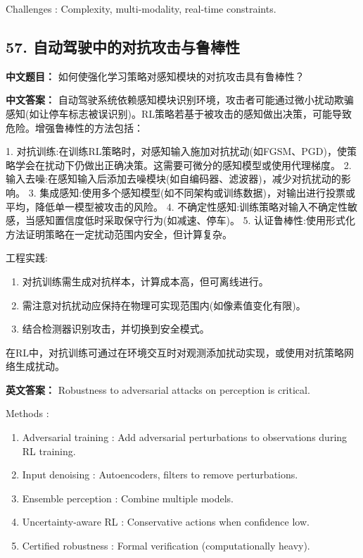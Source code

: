 \documentclass[10pt,a4paper]{ctexart}
\begin{document}
 Challenges : Complexity, multi-modality, real-time constraints.

\subsection*{57. 自动驾驶中的对抗攻击与鲁棒性}
\textbf{中文题目：} 如何使强化学习策略对感知模块的对抗攻击具有鲁棒性？

\textbf{中文答案：}  
自动驾驶系统依赖感知模块识别环境，攻击者可能通过微小扰动欺骗感知(如让停车标志被误识别)。RL策略若基于被攻击的感知做出决策，可能导致危险。增强鲁棒性的方法包括：

1.  对抗训练:在训练RL策略时，对感知输入施加对抗扰动(如FGSM、PGD)，使策略学会在扰动下仍做出正确决策。这需要可微分的感知模型或使用代理梯度。
2.  输入去噪:在感知输入后添加去噪模块(如自编码器、滤波器)，减少对抗扰动的影响。
3.  集成感知:使用多个感知模型(如不同架构或训练数据)，对输出进行投票或平均，降低单一模型被攻击的风险。
4.  不确定性感知:训练策略对输入不确定性敏感，当感知置信度低时采取保守行为(如减速、停车)。
5.  认证鲁棒性:使用形式化方法证明策略在一定扰动范围内安全，但计算复杂。

 工程实践:
\begin{enumerate}
    \item 对抗训练需生成对抗样本，计算成本高，但可离线进行。
    \item 需注意对抗扰动应保持在物理可实现范围内(如像素值变化有限)。
    \item 结合检测器识别攻击，并切换到安全模式。
\end{enumerate}

在RL中，对抗训练可通过在环境交互时对观测添加扰动实现，或使用对抗策略网络生成扰动。

\textbf{英文答案：}  
Robustness to adversarial attacks on perception is critical.

 Methods :
\begin{enumerate}
    \item Adversarial training : Add adversarial perturbations to observations during RL training.
    \item Input denoising : Autoencoders, filters to remove perturbations.
    \item Ensemble perception : Combine multiple models.
    \item Uncertainty-aware RL : Conservative actions when confidence low.
    \item Certified robustness : Formal verification (computationally heavy).
\end{enumerate}
\end{document}
